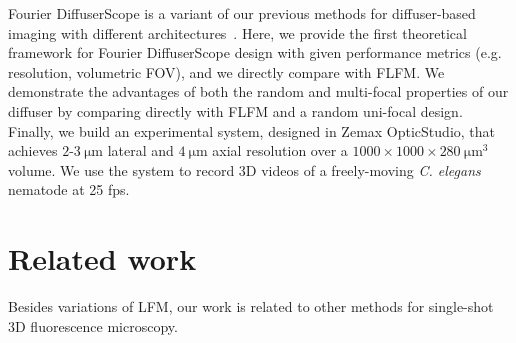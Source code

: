 \documentclass{osa-article}
\begin{document}
Fourier DiffuserScope is a variant of our previous methods for diffuser-based imaging with different architectures~\cite{antipa2018diffusercam,antipa2016diffuserLF,liu2019diffuser,monakhova2019learned,kuo2020flatscope, yanny2019randoscope}. Here, we provide the first theoretical framework for Fourier DiffuserScope design with given performance metrics (e.g. resolution, volumetric FOV), and we directly compare with FLFM. We demonstrate the advantages of both the random and multi-focal properties of our diffuser by comparing directly with FLFM and a random uni-focal design. Finally, we build an experimental system, designed in Zemax OpticStudio, that achieves $2$-$\SI{3}{\micro\meter}$ lateral and $\SI{4}{\micro\meter}$ axial resolution over a $1000 \times 1000 \times \SI{280}{\micro\meter \cubed}$ volume. We use the system to record 3D videos of a freely-moving \textit{C. elegans} nematode at 25 fps. 




\section{Related work}


Besides variations of LFM, our work is related to other methods for single-shot 3D fluorescence microscopy.
\end{document}
